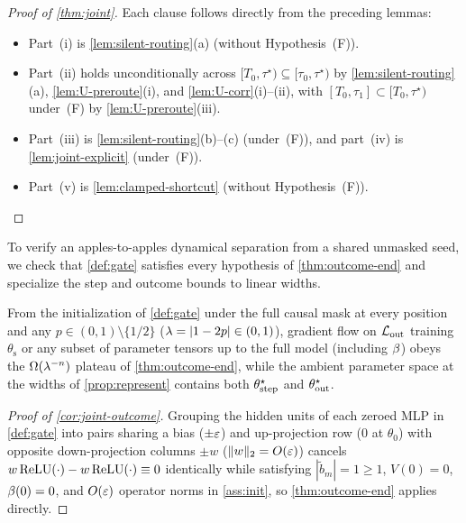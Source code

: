 \begin{proof}[Proof of \cref{thm:joint}]
Each clause follows directly from the preceding lemmas:
\begin{itemize}[leftmargin=*]
\item Part~(i) is \cref{lem:silent-routing}(a) (without Hypothesis~(F)).
\item Part~(ii) holds unconditionally across $[T_0, \tau^\star) \subseteq [\tau_0, \tau^\star)$ by \cref{lem:silent-routing}(a), \cref{lem:U-preroute}(i), and \cref{lem:U-corr}(i)--(ii), with $[T_0, \tau_1] \subset [T_0, \tau^\star)$ under~(F) by \cref{lem:U-preroute}(iii).
\item Part~(iii) is \cref{lem:silent-routing}(b)--(c) (under~(F)), and part~(iv) is \cref{lem:joint-explicit} (under~(F)).
\item Part~(v) is \cref{lem:clamped-shortcut} (without Hypothesis~(F)).\qedhere
\end{itemize}
\end{proof}

To verify an apples-to-apples dynamical separation from a shared unmasked seed, we check that \cref{def:gate} satisfies every hypothesis of \cref{thm:outcome-end} and specialize the step and outcome bounds to linear widths.

\begin{corollary}
\label{cor:joint-outcome}
From the initialization of \cref{def:gate} under the full causal mask at every position and any $p \in (0,1)\setminus\{1/2\}$ ($\lambda = |1-2p| \in (0,1)$), gradient flow on $\mathcal L_{\mathrm{out}}$ training $\theta_{\mathrm s}$ or any subset of parameter tensors up to the full model (including $\beta$) obeys the $\Omega(\lambda^{-n})$ plateau of \cref{thm:outcome-end}, while the ambient parameter space at the widths of \cref{prop:represent} contains both $\theta^\star_{\mathrm{step}}$ and $\theta^\star_{\mathrm{out}}$.
\end{corollary}
\begin{proof}[Proof of \cref{cor:joint-outcome}]
Grouping the hidden units of each zeroed MLP in \cref{def:gate} into pairs sharing a bias ($\pm\varepsilon$) and up-projection row ($0$ at $\theta_0$) with opposite down-projection columns $\pm w$ ($\|w\|_2 = O(\varepsilon)$) cancels $w\operatorname{ReLU}(\cdot) - w\operatorname{ReLU}(\cdot) \equiv 0$ identically while satisfying $|\tilde b_m| = 1 \ge 1$, $V(0) = 0$, $\beta(0) = 0$, and $O(\varepsilon)$ operator norms in \cref{ass:init}, so \cref{thm:outcome-end} applies directly.
\end{proof}


